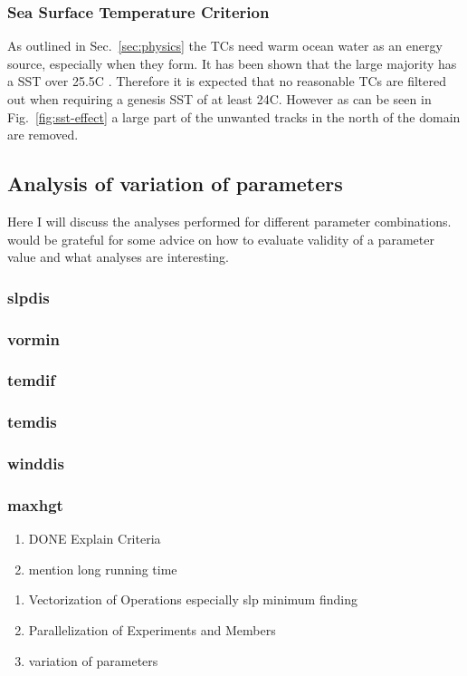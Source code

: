 \subsubsection*{Sea Surface Temperature Criterion}
As outlined in Sec.~\ref{sec:physics} the TCs need warm ocean water as an
energy source, especially when they form. It has been shown that the large
majority has a SST over 25.5\degree C \cite{sst-paper}. Therefore it is
expected that no reasonable TCs are filtered out when requiring a genesis SST
of at least 24\degree C. However as can be seen in Fig.~\ref{fig:sst-effect}
a large part of the unwanted tracks in the north of the domain are removed.

\subsection{Analysis of variation of parameters}
Here I will discuss the analyses performed for different parameter
combinations.
would be grateful for some advice on how to evaluate validity of a parameter
value and what analyses are interesting.
\subsubsection{slpdis}
\subsubsection{vormin}
\subsubsection{temdif}
\subsubsection{temdis}
\subsubsection{winddis}
\subsubsection{maxhgt}

\begin{enumerate}
	\item DONE Explain Criteria
	\item mention long running time
\end{enumerate}
\begin{enumerate}
	\item Vectorization of Operations especially slp minimum finding
	\item Parallelization of Experiments and Members
	\item variation of parameters
\end{enumerate}
